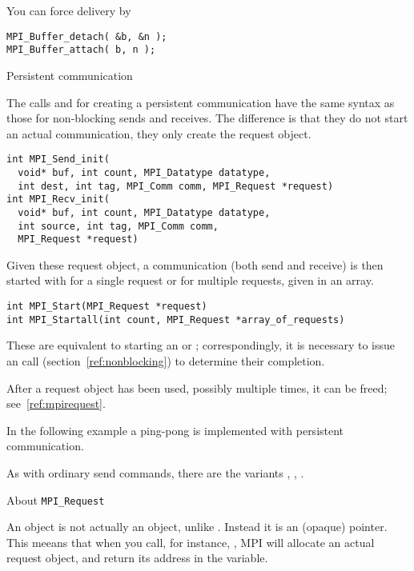 You can force delivery by
\begin{verbatim}
MPI_Buffer_detach( &b, &n );
MPI_Buffer_attach( b, n );
\end{verbatim}

 {Persistent communication}

The calls  and 
for creating a persistent communication have the same syntax as 
those for non-blocking sends and receives. The difference is that they do not start
an actual communication, they only create the request object.
\begin{verbatim}
int MPI_Send_init(
  void* buf, int count, MPI_Datatype datatype, 
  int dest, int tag, MPI_Comm comm, MPI_Request *request) 
int MPI_Recv_init(
  void* buf, int count, MPI_Datatype datatype, 
  int source, int tag, MPI_Comm comm, 
  MPI_Request *request)
\end{verbatim}

Given these request object, a communication (both send and receive) is then started
with  for a single request or  for 
multiple requests, given in an array.
\begin{verbatim}
int MPI_Start(MPI_Request *request)
int MPI_Startall(int count, MPI_Request *array_of_requests) 
\end{verbatim}
These are equivalent to starting an  or ; correspondingly, 
it is necessary to issue an  call (section~\ref{ref:nonblocking})
to determine their completion.

After a request object has been used, possibly multiple times, it can be freed; see~\ref{ref:mpirequest}.

In the following example a ping-pong is implemented with persistent communication.

As with ordinary send commands, there are the variants
,
,
.


 {About \texttt{MPI\_Request}}
\label{ref:mpirequest}

An  object is not actually an object,
unlike . Instead it is an (opaque) pointer.
This meeans that when you call, for instance, ,
MPI will allocate an actual request object, and return its
address in the  variable.

